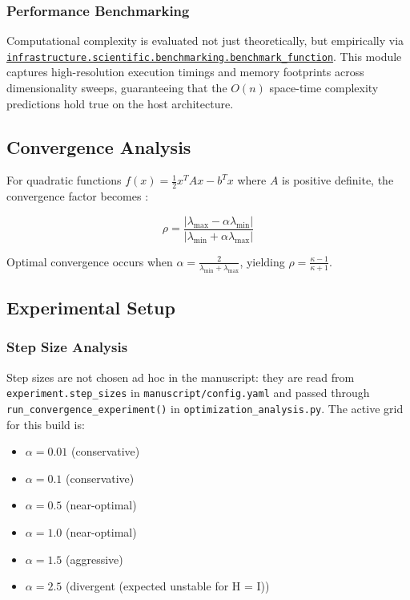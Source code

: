 \documentclass[
]{article}
\providecommand{\tightlist}{%
  \setlength{\itemsep}{0pt}\setlength{\parskip}{0pt}}
\begin{document}
\subsubsection{Performance Benchmarking}\label{performance-benchmarking}

Computational complexity is evaluated not just theoretically, but
empirically via
\href{https://github.com/docxology/template/blob/main/infrastructure/scientific/benchmarking.py}{\texttt{infrastructure.scientific.benchmarking.benchmark\_function}}.
This module captures high-resolution execution timings and memory
footprints across dimensionality sweeps, guaranteeing that the \(O(n)\)
space-time complexity predictions hold true on the host architecture.

\subsection{Convergence Analysis}\label{convergence-analysis}

For quadratic functions \(f(x) = \frac{1}{2}x^T A x - b^T x\) where
\(A\) is positive definite, the convergence factor becomes
\citep{bertsekas1999nonlinear}:

\begin{equation}
\label{eq:convergence_factor}
\rho = \frac{|\lambda_{\max} - \alpha\lambda_{\min}|}{|\lambda_{\min} + \alpha\lambda_{\max}|}
\end{equation}

Optimal convergence occurs when
\(\alpha = \frac{2}{\lambda_{\min} + \lambda_{\max}}\), yielding
\(\rho = \frac{\kappa - 1}{\kappa + 1}\).

\subsection{Experimental Setup}\label{experimental-setup}

\subsubsection{Step Size Analysis}\label{step-size-analysis}

Step sizes are not chosen ad hoc in the manuscript: they are read from
\texttt{experiment.step\_sizes} in \texttt{manuscript/config.yaml} and
passed through \texttt{run\_convergence\_experiment()} in
\texttt{optimization\_analysis.py}. The active grid for this build is:

\begin{itemize}
\tightlist
\item
  \(\alpha = 0.01\) (conservative)
\item
  \(\alpha = 0.1\) (conservative)
\item
  \(\alpha = 0.5\) (near-optimal)
\item
  \(\alpha = 1.0\) (near-optimal)
\item
  \(\alpha = 1.5\) (aggressive)
\item
  \(\alpha = 2.5\) (divergent (expected unstable for H = I))
\end{itemize}
\end{document}
